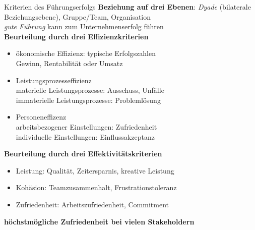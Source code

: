 \documentclass{cheatsheet}
\begin{document}
    \begin{sectionbox}{Kriterien des Führungserfolgs}
        \textbf{Beziehung auf drei Ebenen}: \emph{Dyade} (bilaterale Beziehungsebene), Gruppe/Team, Organisation\\
        \ra \emph{gute Führung} kann zum Unternehmenserfolg führen\\
        \textbf{Beurteilung durch drei Effizienzkriterien}
        \begin{itemize}
            \item ökonomische Effizienz: typische Erfolgszahlen\\
            \ra Gewinn, Rentabilität oder Umsatz\\
            \item Leistungsprozesseffizienz\\
            \ra materielle Leistungsprozesse: Ausschuss, Unfälle\\
            \ra immaterielle Leistungsprozesse: Problemlösung\\
            \item Personeneffizenz\\
            \ra arbeitsbezogener Einstellungen: Zufriedenheit\\
            \ra individuelle Einstellungen: Einflussakzeptanz
        \end{itemize}
         \textbf{Beurteilung durch drei Effektivitätskriterien}
         \begin{itemize}
             \item Leistung: Qualität, Zeitersparnis, kreative Leistung
             \item Kohäsion: Teamzusammenhalt, Frustrationstoleranz
             \item Zufriedenheit: Arbeitszufriedenheit, Commitment
         \end{itemize}
         \textbf{höchstmögliche Zufriedenheit bei vielen Stakeholdern}
    \end{sectionbox}
\end{document}
